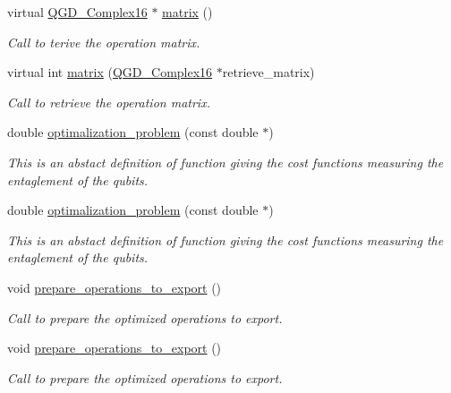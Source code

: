 \begin{DoxyCompactItemize}
virtual \hyperlink{struct_q_g_d___complex16}{Q\+G\+D\+\_\+\+Complex16} $\ast$ \hyperlink{class_operation_acf7d1765143285ff73772ae860109988}{matrix} ()
\begin{DoxyCompactList}\small\item\em Call to terive the operation matrix. \end{DoxyCompactList}\item 
virtual int \hyperlink{class_operation_add11c6ea2626d8dbcbd00f328a8a8279}{matrix} (\hyperlink{struct_q_g_d___complex16}{Q\+G\+D\+\_\+\+Complex16} $\ast$retrieve\+\_\+matrix)
\begin{DoxyCompactList}\small\item\em Call to retrieve the operation matrix. \end{DoxyCompactList}\item 
double \hyperlink{class_two___qubit___decomposition_a5e78d4451729dee394c6f3b0b78c5816}{optimalization\+\_\+problem} (const double $\ast$)
\begin{DoxyCompactList}\small\item\em This is an abstact definition of function giving the cost functions measuring the entaglement of the qubits. \end{DoxyCompactList}\item 
double \hyperlink{class_two___qubit___decomposition_a5e78d4451729dee394c6f3b0b78c5816}{optimalization\+\_\+problem} (const double $\ast$)
\begin{DoxyCompactList}\small\item\em This is an abstact definition of function giving the cost functions measuring the entaglement of the qubits. \end{DoxyCompactList}\item 
void \hyperlink{class_decomposition___base_a965838902240670119c0ad68d087c322}{prepare\+\_\+operations\+\_\+to\+\_\+export} ()
\begin{DoxyCompactList}\small\item\em Call to prepare the optimized operations to export. \end{DoxyCompactList}\item 
void \hyperlink{class_decomposition___base_a965838902240670119c0ad68d087c322}{prepare\+\_\+operations\+\_\+to\+\_\+export} ()
\begin{DoxyCompactList}\small\item\em Call to prepare the optimized operations to export. \end{DoxyCompactList}\item 

\end{DoxyCompactItemize}
